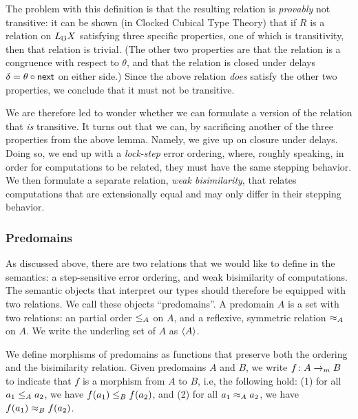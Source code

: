 The problem with this definition is that the resulting relation is \emph{provably} not
transitive: it can be shown (in Clocked Cubical Type Theory) that if $R$ is a
relation on $L_\mho X$ satisfying three specific properties, one of which is
transitivity, then that relation is trivial.
(The other two properties are that the relation is a congruence with respect to $\theta$,
and that the relation is closed under delays $\delta = \theta \circ \mathsf{next}$ on either side.)
Since the above relation \emph{does} satisfy the other two properties, we conclude
that it must not be transitive.


We are therefore led to wonder whether we can formulate a version of the relation
that \emph{is} transitive.
It turns out that we can, by sacrificing another of the three properties from
the above lemma. Namely, we give up on closure under delays. Doing so, we end up
with a \emph{lock-step} error ordering, where, roughly speaking, in order for
computations to be related, they must have the same stepping behavior.
%
We then formulate a separate relation, \emph{weak bisimilarity}, that relates computations
that are extensionally equal and may only differ in their stepping behavior.



\subsubsection{Predomains}\label{sec:predomains}

As discussed above, there are two relations that we would like to define
in the semantics: a step-sensitive error ordering, and weak bisimilarity of computations.
%
The semantic objects that interpret our types should therefore be equipped with
two relations. We call these objects ``predomains''.
A predomain $A$ is a set with two relations: an partial order $\le_A$ on $A$, and
a reflexive, symmetric relation $\approx_A$ on $A$.
We write the underling set of $A$ as $\langle {A} \rangle$.

We define morphisms of predomains as functions that preserve both
the ordering and the bisimilarity relation. Given predomains
$A$ and $B$, we write $f \colon A \to_m B$ to indicate that $f$ is a morphism
from $A$ to $B$, i.e, the following hold:
(1) for all $a_1 \le_A a_2$, we have $f(a_1) \le_{B} f(a_2)$, and
(2) for all $a_1 \approx_A a_2$, we have $f(a_1) \approx_{B} f(a_2)$.


